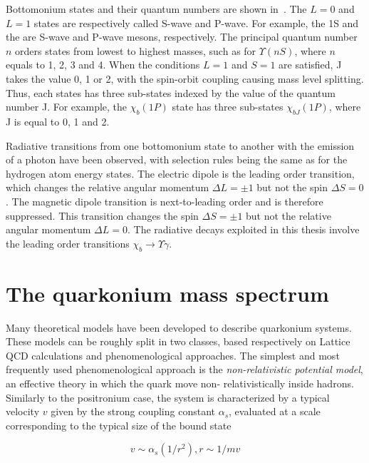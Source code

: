 



Bottomonium states and their quantum numbers are shown
in~. The $L = 0$ and $L = 1$ states are respectively
called S-wave and P-wave. For example, the \Y1S and the \chiboneOneP are S-wave and 
P-wave mesons, respectively. The principal quantum number $n$ orders states from lowest to highest
masses, such as for $\Upsilon(nS)$, where $n$ equals to 1, 2, 3 and 4. When the
conditions $L = 1$ and $S = 1$ are satisfied, J takes the value 0, 1 or 2, with the spin-orbit coupling 
causing mass level splitting. Thus,
each \chib states has three sub-states indexed by the value of the quantum
number J. For example, the $\chi_b(1P)$ state has three sub-states $\chi_{bJ}(1P)$,
where J is equal to 0, 1 and 2.

Radiative transitions from one bottomonium state to another with the emission of a photon 
have been observed, with selection rules being the same as for the hydrogen atom energy states. 
The electric dipole is the leading order transition, which changes the relative angular
momentum $\Delta L  = \pm 1$ but not the spin $\Delta S = 0$. The magnetic
dipole transition is next-to-leading order and is therefore suppressed. 
This transition changes the spin $\Delta S = \pm 1$ but not the relative
angular momentum $\Delta L = 0$. The radiative decays exploited in 
this thesis involve the leading order transitions $\chi_b \rightarrow \Upsilon \gamma$. 

\section{The quarkonium mass spectrum}

Many theoretical models have been developed to describe quarkonium systems.
These models can be roughly split in two classes, based respectively on Lattice
QCD calculations and phenomenological approaches. The simplest and most
frequently used phenomenological approach is the {\it non-relativistic
potential model}, an effective theory in which the quark move non-
relativistically inside hadrons. Similarly to the positronium case, the system
is characterized by a typical velocity $v$ given by the strong coupling constant
$\alpha_s$, evaluated at a scale corresponding to the typical size of the bound
state

\begin{equation}
v \sim \alpha_s(1/r^2), r \sim 1/mv
\end{equation}


